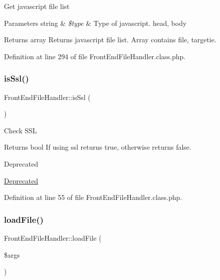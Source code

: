 Get javascript file list


\begin{DoxyParams}[1]{Parameters}
string & {\em \$type} & Type of javascript. head, body \\
\hline
\end{DoxyParams}
\begin{DoxyReturn}{Returns}
array Returns javascript file list. Array contains file, targetie. 
\end{DoxyReturn}


Definition at line 294 of file Front\+End\+File\+Handler.\+class.\+php.

\hypertarget{classFrontEndFileHandler_a2bd70c621572f784c4e563d0dafa0fc2}{}\label{classFrontEndFileHandler_a2bd70c621572f784c4e563d0dafa0fc2} 
\subsubsection{\texorpdfstring{is\+Ssl()}{isSsl()}}
{\footnotesize\ttfamily Front\+End\+File\+Handler\+::is\+Ssl (\begin{DoxyParamCaption}{ }\end{DoxyParamCaption})}

Check S\+SL

\begin{DoxyReturn}{Returns}
bool If using ssl returns true, otherwise returns false. 
\end{DoxyReturn}
\begin{DoxyRefDesc}{Deprecated}
\item[\hyperlink{deprecated__deprecated000009}{Deprecated}]\end{DoxyRefDesc}


Definition at line 55 of file Front\+End\+File\+Handler.\+class.\+php.

\hypertarget{classFrontEndFileHandler_aeb802ae7b7b315da73ec3be224ce9e9f}{}\label{classFrontEndFileHandler_aeb802ae7b7b315da73ec3be224ce9e9f} 
\subsubsection{\texorpdfstring{load\+File()}{loadFile()}}
{\footnotesize\ttfamily Front\+End\+File\+Handler\+::load\+File (\begin{DoxyParamCaption}\item[{}]{\$args }\end{DoxyParamCaption})}

